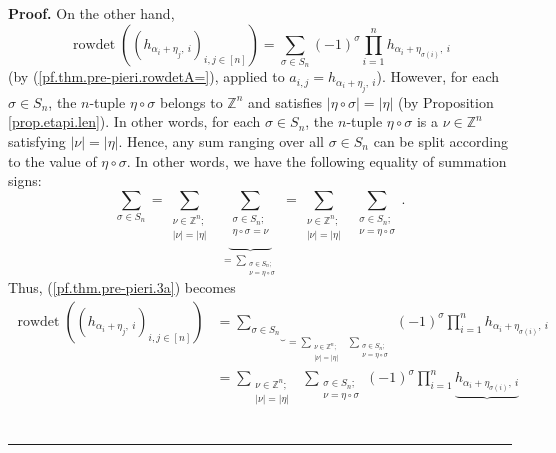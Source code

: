 \documentclass[numbers=enddot,12pt,final,onecolumn,notitlepage,english]{scrartcl}%
\theoremstyle{definition}
\newenvironment{proof}[1][Proof]{\noindent\textbf{#1.} }{\ \rule{0.5em}{0.5em}}
\let\sumnonlimits\sum
\let\prodnonlimits\prod
\renewcommand{\sum}{\sumnonlimits\limits}
\renewcommand{\prod}{\prodnonlimits\limits}
\newenvironment{verlong}{}{}
\begin{document}
\begin{verlong}
\begin{proof}
On the other hand,%
\begin{equation}
\operatorname*{rowdet}\left(  \left(  h_{\alpha_{i}+\eta_{j},\ i}\right)
_{i,j\in\left[  n\right]  }\right)  =\sum_{\sigma\in S_{n}}\left(  -1\right)
^{\sigma}\prod_{i=1}^{n}h_{\alpha_{i}+\eta_{\sigma\left(  i\right)  },\ i}
\label{pf.thm.pre-pieri.3a}%
\end{equation}
(by (\ref{pf.thm.pre-pieri.rowdetA=}), applied to $a_{i,j}=h_{\alpha_{i}%
+\eta_{j},\ i}$). However, for each $\sigma\in S_{n}$, the $n$-tuple
$\eta\circ\sigma$ belongs to $\mathbb{Z}^{n}$ and satisfies $\left\vert
\eta\circ\sigma\right\vert =\left\vert \eta\right\vert $ (by Proposition
\ref{prop.etapi.len}). In other words, for each $\sigma\in S_{n}$, the
$n$-tuple $\eta\circ\sigma$ is a $\nu\in\mathbb{Z}^{n}$ satisfying $\left\vert
\nu\right\vert =\left\vert \eta\right\vert $. Hence, any sum ranging over all
$\sigma\in S_{n}$ can be split according to the value of $\eta\circ\sigma$. In
other words, we have the following equality of summation signs:%
\[
\sum_{\sigma\in S_{n}}=\sum_{\substack{\nu\in\mathbb{Z}^{n};\\\left\vert
\nu\right\vert =\left\vert \eta\right\vert }}\ \ \underbrace{\sum
_{\substack{\sigma\in S_{n};\\\eta\circ\sigma=\nu}}}_{=\sum_{\substack{\sigma
\in S_{n};\\\nu=\eta\circ\sigma}}}=\sum_{\substack{\nu\in\mathbb{Z}%
^{n};\\\left\vert \nu\right\vert =\left\vert \eta\right\vert }}\ \ \sum
_{\substack{\sigma\in S_{n};\\\nu=\eta\circ\sigma}}.
\]
Thus, (\ref{pf.thm.pre-pieri.3a}) becomes%
\begin{align*}
\operatorname*{rowdet}\left(  \left(  h_{\alpha_{i}+\eta_{j},\ i}\right)
_{i,j\in\left[  n\right]  }\right)   &  =\underbrace{\sum_{\sigma\in S_{n}}%
}_{=\sum_{\substack{\nu\in\mathbb{Z}^{n};\\\left\vert \nu\right\vert
=\left\vert \eta\right\vert }}\ \ \sum_{\substack{\sigma\in S_{n};\\\nu
=\eta\circ\sigma}}}\left(  -1\right)  ^{\sigma}\prod_{i=1}^{n}h_{\alpha
_{i}+\eta_{\sigma\left(  i\right)  },\ i}\\
&  =\sum_{\substack{\nu\in\mathbb{Z}^{n};\\\left\vert \nu\right\vert
=\left\vert \eta\right\vert }}\ \ \sum_{\substack{\sigma\in S_{n};\\\nu
=\eta\circ\sigma}}\left(  -1\right)  ^{\sigma}\prod_{i=1}^{n}%
\underbrace{h_{\alpha_{i}+\eta_{\sigma\left(  i\right)  },\ i}}%

\end{align*}
\end{proof}
\end{verlong}
\end{document}
